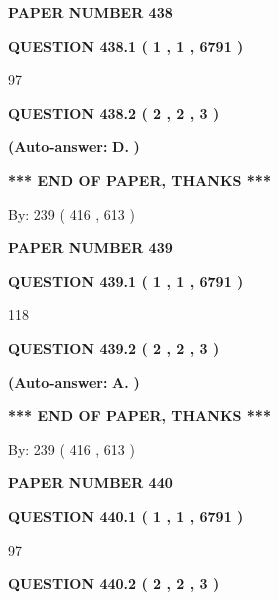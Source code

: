\documentclass{ctexart}
\begin{document}
   
\newpage 
\setcounter{page}{ 
   438001 } 
   
   
 {\textbf{ \Large{ PAPER NUMBER  438  }}}
   
   
   
   
  
  
{\textbf{\large{QUESTION
438.1 
 ( 1 , 1 , 6791 )
}}}

97
  
  
{\textbf{\large{QUESTION
438.2 
 ( 2 , 2 , 3 )
}}}
 
 
{\textbf{(Auto-answer:}}
{\textbf{\large{
D.}}}
{\textbf{)}}
 
 
   
   
   
   
\vspace{1.0in} 
{\textbf{\large{ *** END OF PAPER, THANKS *** }}} 
   
   
\hspace{1.0in} By: 
 239 ( 416 ,  613 )
   
   
   
   
\newpage 
\setcounter{page}{ 
   439001 } 
   
   
 {\textbf{ \Large{ PAPER NUMBER  439  }}}
   
   
   
   
  
  
{\textbf{\large{QUESTION
439.1 
 ( 1 , 1 , 6791 )
}}}

118
  
  
{\textbf{\large{QUESTION
439.2 
 ( 2 , 2 , 3 )
}}}
 
 
{\textbf{(Auto-answer:}}
{\textbf{\large{
A.}}}
{\textbf{)}}
 
 
   
   
   
   
\vspace{1.0in} 
{\textbf{\large{ *** END OF PAPER, THANKS *** }}} 
   
   
\hspace{1.0in} By: 
 239 ( 416 ,  613 )
   
   
   
   
\newpage 
\setcounter{page}{ 
   440001 } 
   
   
 {\textbf{ \Large{ PAPER NUMBER  440  }}}
   
   
   
   
  
  
{\textbf{\large{QUESTION
440.1 
 ( 1 , 1 , 6791 )
}}}

97
  
  
{\textbf{\large{QUESTION
440.2 
 ( 2 , 2 , 3 )
}}}
 
\end{document}
